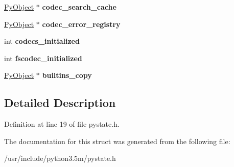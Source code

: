\begin{DoxyCompactItemize}
\item 
\hyperlink{struct__object}{Py\+Object} $\ast$ {\bfseries codec\+\_\+search\+\_\+cache}\hypertarget{struct__is_aa85c05fed3a236e56918fe0c832c3c98}{}\label{struct__is_aa85c05fed3a236e56918fe0c832c3c98}

\item 
\hyperlink{struct__object}{Py\+Object} $\ast$ {\bfseries codec\+\_\+error\+\_\+registry}\hypertarget{struct__is_a98cfa3eae066203fcfc5b884914d6daf}{}\label{struct__is_a98cfa3eae066203fcfc5b884914d6daf}

\item 
int {\bfseries codecs\+\_\+initialized}\hypertarget{struct__is_a84c00194c23e5ca19531761e9f2a9c83}{}\label{struct__is_a84c00194c23e5ca19531761e9f2a9c83}

\item 
int {\bfseries fscodec\+\_\+initialized}\hypertarget{struct__is_a27bd7f4cb8088c9a66871c2bb7843814}{}\label{struct__is_a27bd7f4cb8088c9a66871c2bb7843814}

\item 
\hyperlink{struct__object}{Py\+Object} $\ast$ {\bfseries builtins\+\_\+copy}\hypertarget{struct__is_a85529e9475beff65b9302958f9e46266}{}\label{struct__is_a85529e9475beff65b9302958f9e46266}

\end{DoxyCompactItemize}


\subsection{Detailed Description}


Definition at line 19 of file pystate.\+h.



The documentation for this struct was generated from the following file\+:\begin{DoxyCompactItemize}
\item 
/usr/include/python3.\+5m/pystate.\+h\end{DoxyCompactItemize}

